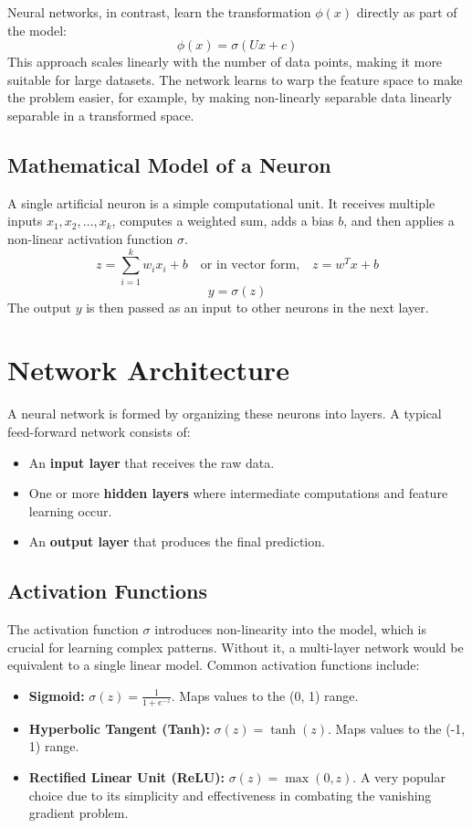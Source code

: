 \documentclass{article}
\begin{document}
\begin{multicols}{2}
Neural networks, in contrast, learn the transformation $\phi(x)$ directly as part of the model:
$$ \phi(x) = \sigma(Ux + c) $$
This approach scales linearly with the number of data points, making it more suitable for large datasets. The network learns to warp the feature space to make the problem easier, for example, by making non-linearly separable data linearly separable in a transformed space.

\subsection{Mathematical Model of a Neuron}
A single artificial neuron is a simple computational unit. It receives multiple inputs $x_1, x_2, \dots, x_k$, computes a weighted sum, adds a bias $b$, and then applies a non-linear activation function $\sigma$.
$$ z = \sum_{i=1}^{k} w_i x_i + b \quad \text{or in vector form,} \quad z = w^T x + b $$
$$ y = \sigma(z) $$
The output $y$ is then passed as an input to other neurons in the next layer.

\section{Network Architecture}
A neural network is formed by organizing these neurons into layers. A typical feed-forward network consists of:
\begin{itemize}
    \item An \textbf{input layer} that receives the raw data.
    \item One or more \textbf{hidden layers} where intermediate computations and feature learning occur.
    \item An \textbf{output layer} that produces the final prediction.
\end{itemize}

\subsection{Activation Functions}
The activation function $\sigma$ introduces non-linearity into the model, which is crucial for learning complex patterns. Without it, a multi-layer network would be equivalent to a single linear model. Common activation functions include:
\begin{itemize}
    \item \textbf{Sigmoid:} $\sigma(z) = \frac{1}{1 + e^{-z}}$. Maps values to the (0, 1) range.
    \item \textbf{Hyperbolic Tangent (Tanh):} $\sigma(z) = \tanh(z)$. Maps values to the (-1, 1) range.
    \item \textbf{Rectified Linear Unit (ReLU):} $\sigma(z) = \max(0, z)$. A very popular choice due to its simplicity and effectiveness in combating the vanishing gradient problem.
\end{itemize}


\end{multicols}
\end{document}

